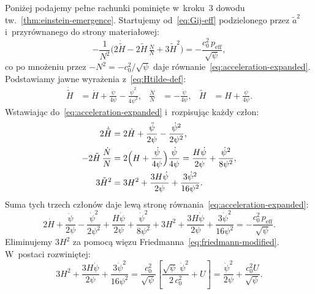 \begin{remark}\label{rem:step3-algebra}
Poni\.zej podajemy pe\l{}ne rachunki pomini\k{e}te w~kroku~3
dowodu tw.~\ref{thm:einstein-emergence}.
Startujemy od~\eqref{eq:Gij-eff} podzielonego przez $\tilde a^2$
i~przyr\'ownanego do strony materia\l{}owej:
\begin{equation}\label{eq:step3-start}
  -\frac{1}{N^2}\!\bigl(
    2\dot{\tilde H}
    - 2\tilde H\,\tfrac{\dot N}{N}
    + 3\tilde H^2
  \bigr)
  = -\frac{c_0^2\,p_{\mathrm{eff}}}{\sqrt\psi},
\end{equation}
co po mno\.zeniu przez $-N^2 = -c_0^2/\sqrt\psi$ daje
r\'ownanie~\eqref{eq:acceleration-expanded}.
Podstawiamy jawne wyra\.zenia z~\eqref{eq:Htilde-def}:
\begin{align}
  \dot{\tilde H}
    &= \dot H + \frac{\ddot\psi}{4\psi}
       - \frac{\dot\psi^2}{4\psi^2},
  &
  \frac{\dot N}{N} &= -\frac{\dot\psi}{4\psi},
  &
  \tilde H &= H + \frac{\dot\psi}{4\psi}.
  \label{eq:step3-subs}
\end{align}
Wstawiaj\k{a}c do~\eqref{eq:acceleration-expanded}
i~rozpisuj\k{a}c ka\.zdy cz\l{}on:
\begin{align}
  2\dot{\tilde H}
    &= 2\dot H + \frac{\ddot\psi}{2\psi}
       - \frac{\dot\psi^2}{2\psi^2},
  \notag\\
  -2\tilde H\,\frac{\dot N}{N}
    &= 2\Bigl(H + \frac{\dot\psi}{4\psi}\Bigr)\frac{\dot\psi}{4\psi}
     = \frac{H\dot\psi}{2\psi} + \frac{\dot\psi^2}{8\psi^2},
  \notag\\
  3\tilde H^2
    &= 3H^2 + \frac{3H\dot\psi}{2\psi}
       + \frac{3\dot\psi^2}{16\psi^2}.
  \label{eq:step3-three-terms}
\end{align}
Suma tych trzech cz\l{}on\'ow daje lew\k{a} stron\k{e}
r\'ownania~\eqref{eq:acceleration-expanded}:
\begin{equation}\label{eq:step3-LHS}
  2\dot H + \frac{\ddot\psi}{2\psi}
  - \frac{\dot\psi^2}{2\psi^2}
  + \frac{H\dot\psi}{2\psi} + \frac{\dot\psi^2}{8\psi^2}
  + 3H^2 + \frac{3H\dot\psi}{2\psi}
  + \frac{3\dot\psi^2}{16\psi^2}
  = -\frac{c_0^2\,p_{\mathrm{eff}}}{\sqrt\psi}.
\end{equation}
Eliminujemy $3H^2$ za pomoc\k{a} wi\k{e}zu
Friedmanna~\eqref{eq:friedmann-modified}. W~postaci
rozwini\k{e}tej:
\begin{equation}\label{eq:friedmann-expanded}
  3H^2 + \frac{3H\dot\psi}{2\psi} + \frac{3\dot\psi^2}{16\psi^2}
  = \frac{c_0^2}{\sqrt\psi}\!\left[
    \frac{\sqrt\psi\;\dot\psi^2}{2\,c_0^2} + U
  \right]
  = \frac{\dot\psi^2}{2\psi} + \frac{c_0^2 U}{\sqrt\psi}.

\end{equation}
\end{remark}
